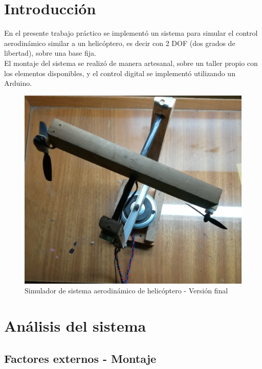 \documentclass{article}
\begin{document}
\newgeometry{} %


\tableofcontents
\newpage



\section{Introducción}

En el presente trabajo práctico se implementó un sistema para simular el control aerodinámico similar a un helicóptero, es decir con 2 DOF (dos grados de libertad), sobre una base fija.\\
El montaje del sistema se realizó de manera artesanal, sobre un taller propio con los elementos disponibles, y el control digital se implementó utilizando un Arduino.\\

\begin{figure}[H]
\centering
\includegraphics[width=0.7\linewidth]{images/modFinal2.jpg}
\caption{Simulador de sistema aerodinámico de helicóptero - Versión final}
\end{figure}

\newpage

\section{Análisis del sistema}
\subsection{Factores externos - Montaje}
\end{document}
